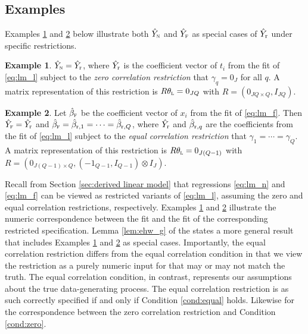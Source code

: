 \documentclass[11pt]{article}
\theoremstyle{definition}
\newtheorem{example}{Example}
\begin{document}
\subsection{Examples}

Examples \ref{ex:rols_neyman} and \ref{ex:rols_fisher} below illustrate both 
$\hat Y_{\textsc{n}}$ and $\hat Y_{\textsc{f}}$ 
as special cases of $\hat Y_{\textup{r}} $ under specific restrictions. 


\begin{example}\label{ex:rols_neyman}
 $\hat Y_{\textsc{n}} = \hat Y_{\textup{r}} $, where $\hat Y_{\textup{r}} $ is the coefficient vector of $t_i$ from the \rolss fit of \eqref{eq:lm_l} subject to the {\it zero correlation restriction} that $\gamma_q = 0_J$ for all $q$. A matrix representation of this restriction is $R\theta_{\textsc{l}}   = 0_{JQ}$ with $R = (0_{JQ\times Q}, I_{JQ})$.
\end{example}

\begin{example}\label{ex:rols_fisher}
Let $\hat\beta_{\textsc{f}}$ be the coefficient vector of $x_i$ from the \olss fit of \eqref{eq:lm_f}. 
Then $\hat Y_{\textsc{f}} = \hat Y_{\textup{r}} $ and $\hat\beta_{\textsc{f}}  = \hat\beta_{\textup{r},1} = \dots = \hat\beta_{\textup{r},Q}$, where $\hat Y_{\textup{r}} $ and $\hat\beta_{\textup{r},q}$ are the coefficients from the \rolss fit of \eqref{eq:lm_l} subject to the {\it equal correlation restriction} that $\gamma_1 = \cdots = \gamma_Q$. A matrix representation of this restriction is $R\theta_{\textsc{l}}   = 0_{J(Q-1)}$ with $R = (0_{J(Q-1)\times Q}, (-1_{Q-1}, I_{Q-1}) \otimes I_J)$.
\end{example}

Recall from Section \ref{sec:derived linear model} that regressions \eqref{eq:lm_n} and \eqref{eq:lm_f} can be viewed as restricted variants of \eqref{eq:lm_l}, assuming the zero and equal correlation restrictions, respectively. 
Examples \ref{ex:rols_neyman} and \ref{ex:rols_fisher} illustrate the numeric correspondence between the \rlss fit and the \olss fit of the corresponding restricted specification. 
Lemma \ref{lem:ehw_g} of the {\sm} states a more general result that includes Examples \ref{ex:rols_neyman} and \ref{ex:rols_fisher} as special cases.
Importantly, the equal correlation restriction differs from the equal correlation condition in that we view the restriction as a purely numeric input for \rlss that may or may not match the truth. The equal correlation condition, in contrast, represents our assumptions about the true data-generating process. 
The equal correlation restriction is as such correctly specified if and only if Condition \ref{cond:equal} holds.
Likewise for the correspondence between the zero correlation restriction and Condition \ref{cond:zero}.
\end{document}
